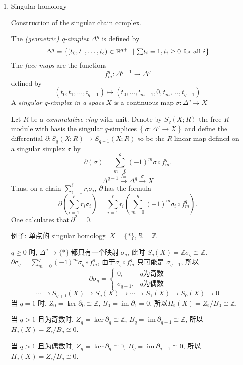 \documentclass[UTF8]{ctexart}
\DeclareMathOperator{\im}{im}
\begin{document}
\begin{enumerate}
\item Singular homology\cite[p.1]{kirklecture}\cite{singular_homology}

Construction of the singular chain complex.

The \textit{(geometric) q-simplex} $\Delta^q$ is defined by
\[
\Delta^q = \left\{(t_0,t_1,\ldots,t_q)\in \mathbb{R}^{q+1}\mid \mathsmaller{\sum} t_i = 1, t_i \geq 0\text{ for all } i\right\}
\]
The \textit{face maps} are the functions
\[
f_m^q : \Delta^{q-1} \to \Delta^q
\]
defined by
\[
(t_0,t_1,\ldots,t_{q-1}) \mapsto (t_0,\ldots,t_{m-1},0,t_m,\ldots,t_{q-1})
\]
A \textit{singular $q$-simplex in a space} $X$ is a continuous map $\sigma : \Delta^{q} \to X$.

Let $R$ be a \textit{commutative ring} with unit. Denote by $S_q(X;R)$ the free $R$-module with basis the singular $q$-simplices $\left\{\sigma : \Delta^q \to X\right\}$ and define the differential $\partial : S_q(X;R)\to S_{q-1}(X;R)$ to be the $R$-linear map defined on a singular simplex $\sigma$ by
\[
\partial(\sigma) = \sum_{m=0}^{q} (-1)^m\sigma\circ f_m^q.
\]
\[
\Delta^{q-1} \overset{f_m^q}{\to} \Delta^q \overset{\sigma}{\to} X
\]
Thus, on a chain $\sum_{i=1}^{\ell}r_i\sigma_i$, $\partial$ has the formula
\[
\partial\left(\sum_{i=1}^{\ell}r_i\sigma_i\right) = \sum_{i=1}^{\ell}r_i\left(\sum_{m=0}^{q}\left(-1\right)^m \sigma_i \circ f_m^q \right).
\]
One calculates that $\partial^2 = 0$.

例子: 单点的 singular homology. $X = \{\ast\}, R=\mathbb{Z}$.

$q\geq0$ 时, $\Delta^q \to \{\ast\}$ 都只有一个映射 $\sigma_q$, 此时 $S_q(X) = \mathbb{Z}\sigma_q \cong \mathbb{Z}$.
$\partial\sigma_q = \sum\limits_{m=0}^{q}(-1)^m\sigma_q\circ f_m^q$, 由于$\sigma_q\circ f_m^q$ 只可能是 $\sigma_{q-1}$, 所以
\[
\partial\sigma_q =
\begin{cases}
0, & q\text{为奇数}\\
\sigma_{q-1}, & q\text{为偶数}
\end{cases}
\]
\[
\cdots\to S_{q+1}(X)\to S_q(X) \to\cdots \to S_1(X)\to S_0(X)\to 0
\]
当 $q=0$ 时, $Z_0 = \ker\partial_0 \cong \mathbb{Z}$, $B_0 = \im\partial_1 = 0$, 所以$H_0(X) = Z_0/B_0 \cong \mathbb{Z}$.

当 $q > 0$ 且为奇数时, $Z_q = \ker\partial_q \cong \mathbb{Z}$, $B_q = \im\partial_{q+1} \cong \mathbb{Z}$, 所以 $H_q(X) = Z_q/B_q \cong 0$.

当 $q > 0$ 且为偶数时, $Z_q = \ker\partial_q \cong 0$, $B_q = \im\partial_{q+1} \cong 0$, 所以 $H_q(X) = Z_q/B_q \cong 0$.


\end{enumerate}
\end{document}
